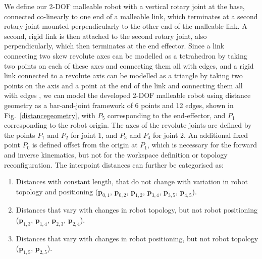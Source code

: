 We define our 2-DOF malleable robot with a vertical rotary joint at the base, connected co-linearly to one end of a malleable link, which terminates at a second rotary joint mounted perpendicularly to the other end of the malleable link. A second, rigid link is then attached to the second rotary joint, also perpendicularly, which then terminates at the end effector. Since a link connecting two skew revolute axes can be modelled as a tetrahedron by taking two points on each of these axes and connecting them all with edges, and a rigid link connected to a revolute axis can be modelled as a triangle by taking two points on the axis and a point at the end of the link and connecting them all with edges \cite{rojas2016coupler}, we can model the developed 2-DOF malleable robot using distance geometry as a bar-and-joint framework of 6 points and 12 edges, shown in Fig.~\ref{distancegeometry}, with $P_5$ corresponding to the end-effector, and $P_1$ corresponding to the robot origin. The axes of the revolute joints are defined by the points $P_1$ and $P_2$ for joint 1, and $P_3$ and $P_4$ for joint 2. An additional fixed point $P_0$ is defined offset from the origin at $P_1$, which is necessary for the forward and inverse kinematics, but not for the workspace definition or topology reconfiguration. The interpoint distances can further be categorised as:
\begin{enumerate}
  \item Distances with constant length, that do not change with variation in robot topology and positioning ($\mathbf{p}_{0,1}$, $\mathbf{p}_{0,2}$, $\mathbf{p}_{1,2}$, $\mathbf{p}_{3,4}$, $\mathbf{p}_{3,5}$, $\mathbf{p}_{4,5}$).
  \item Distances that vary with changes in robot topology, but not robot positioning ($\mathbf{p}_{1,3}$, $\mathbf{p}_{1,4}$, $\mathbf{p}_{2,3}$, $\mathbf{p}_{2,4}$).
  \item Distances that vary with changes in robot positioning, but not robot topology ($\mathbf{p}_{1,5}$, $\mathbf{p}_{2,5}$).
\end{enumerate}


